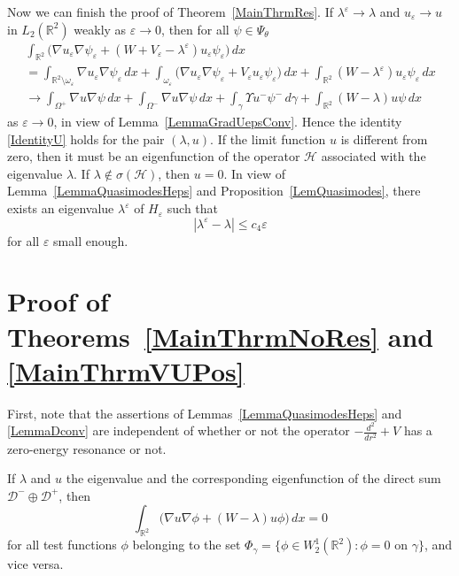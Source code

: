 \documentclass[reqno]{amsart}
\theoremstyle{plain}
\numberwithin{equation}{section}
\newcommand{\Real}{\mathbb R}
\newcommand{\eps}{\varepsilon}
\newcommand{\cH}{\mathcal{H}}
\renewcommand{\leq}{\leqslant}
\begin{document}
Now we can finish the proof of Theorem~\ref{MainThrmRes}.
If $\lambda^\eps\to \lambda$ and $u_\eps\to u$ in $L_2(\Real^2)$ weakly as $\eps\to 0$, then for all $\psi\in \Psi_\theta$
\begin{multline*}
  \int_{\Real^2}\big(\nabla u_\eps \nabla \psi_\eps+
              (W+V_\eps-\lambda^\eps)u_\eps \psi_\eps\big)\,dx
              \\=
               \int_{\Real^2\setminus\omega_\eps}\nabla u_\eps \nabla \psi_\eps\,dx+ \int_{\omega_\eps}\big(\nabla u_\eps \nabla \psi_\eps+
   V_\eps u_\eps \psi_\eps\big)\,dx+\int_{\Real^2}(W-\lambda^\eps)u_\eps \psi_\eps\,dx\\
   \to
     \int_{\Omega^+}\nabla u \nabla \psi\,dx+\int_{\Omega^-}\nabla u \nabla \psi\,dx+\int_\gamma\Upsilon u^-\psi^-\,d\gamma+\int_{\Real^2}(W-\lambda)u\psi\,dx
\end{multline*}
as $\eps\to 0$, in view of Lemma~\ref{LemmaGradUepsConv}. Hence the identity \eqref{IdentityU} holds for the pair $(\lambda, u)$. If the limit function $u$ is different from zero, then it must be an eigenfunction of the operator $\cH$ associated with the eigenvalue $\lambda$. If $\lambda\not\in \sigma(\cH)$, then $u=0$.
In view of Lemma~\ref{LemmaQuasimodesHeps} and Proposition~\ref{LemQuasimodes}, there exists an eigenvalue $\lambda^\eps$ of $H_\eps$ such that
\begin{equation*}
  |\lambda^\eps-\lambda|\leq c_4\eps
\end{equation*}
for all $\eps$  small enough.








\section{Proof of  Theorems~\ref{MainThrmNoRes} and \ref{MainThrmVUPos}}
First, note that the assertions of Lemmas~\ref{LemmaQuasimodesHeps} and \ref{LemmaDconv} are independent of whether or not the operator $-\frac{d^2}{d r^2}+V$ has a zero-energy resonance or not.


If $\lambda$ and $u$ the eigenvalue and the corresponding eigenfunction of
 the direct sum $\mathcal{D}^-\oplus\mathcal{D}^+$, then
\begin{equation}\label{IdentityU0}
   \int_{\Real^2}\big(\nabla u \nabla \phi
   +(W-\lambda)u\phi\big)\,dx=0
\end{equation}
for all test functions $\phi$ belonging to the set
$\Phi_\gamma=\{\phi\in W^1_2(\Real^2)\colon \phi=0 \text{ on }\gamma\}$, and vice versa.
\end{document}
